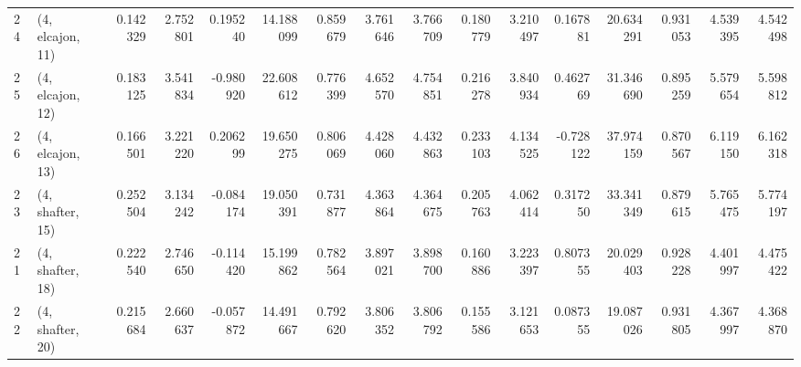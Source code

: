 \begin{tabular}{llrrrrrrrrrrrrrr}
24 &  (4, elcajon, 11) &   0.142329 &  2.752801 &  0.195240 &   14.188099 &  0.859679 &   3.761646 &   3.766709 &  0.180779 &  3.210497 &  0.167881 &   20.634291 &  0.931053 &   4.539395 &   4.542498 \\
25 &  (4, elcajon, 12) &   0.183125 &  3.541834 & -0.980920 &   22.608612 &  0.776399 &   4.652570 &   4.754851 &  0.216278 &  3.840934 &  0.462769 &   31.346690 &  0.895259 &   5.579654 &   5.598812 \\
26 &  (4, elcajon, 13) &   0.166501 &  3.221220 &  0.206299 &   19.650275 &  0.806069 &   4.428060 &   4.432863 &  0.233103 &  4.134525 & -0.728122 &   37.974159 &  0.870567 &   6.119150 &   6.162318 \\
23 &  (4, shafter, 15) &   0.252504 &  3.134242 & -0.084174 &   19.050391 &  0.731877 &   4.363864 &   4.364675 &  0.205763 &  4.062414 &  0.317250 &   33.341349 &  0.879615 &   5.765475 &   5.774197 \\
21 &  (4, shafter, 18) &   0.222540 &  2.746650 & -0.114420 &   15.199862 &  0.782564 &   3.897021 &   3.898700 &  0.160886 &  3.223397 &  0.807355 &   20.029403 &  0.928228 &   4.401997 &   4.475422 \\
22 &  (4, shafter, 20) &   0.215684 &  2.660637 & -0.057872 &   14.491667 &  0.792620 &   3.806352 &   3.806792 &  0.155586 &  3.121653 &  0.087355 &   19.087026 &  0.931805 &   4.367997 &   4.368870 \\
\bottomrule
\end{tabular}
